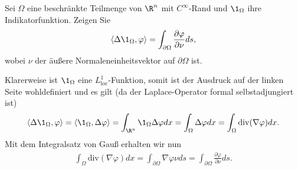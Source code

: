 
\begin{exercise}

Sei $\Omega$ eine beschränkte Teilmenge von $\R^n$ mit $C^{\infty}$-Rand und $\1_\Omega$ ihre
Indikatorfunktion. Zeigen Sie
\begin{align*}
  \langle \Delta \1_\Omega, \varphi \rangle
  = \int_{\partial\Omega} \frac{\partial \varphi}{\partial \nu} ds,
\end{align*}
wobei $\nu$ der äußere Normaleneinheitsvektor auf $\partial\Omega$ ist.

\end{exercise}


\begin{solution}

Klarerweise ist $\1_\Omega$ eine $L^1_{\mathrm{loc}}$-Funktion, somit ist der Ausdruck
auf der linken Seite wohldefiniert und es gilt (da der Laplace-Operator formal selbstadjungiert ist)
\begin{align*}
  \langle \Delta \1_\Omega, \varphi \rangle
  = \langle  \1_\Omega, \Delta \varphi \rangle
  = \int_{\R^n}\1_\Omega \Delta \varphi dx
  = \int_{\Omega} \Delta \varphi dx
  = \int_{\Omega} \mathrm{div} (\nabla \varphi) dx.
\end{align*}
Mit dem Integralsatz von Gauß erhalten wir nun
\begin{align*}
  \int_{\Omega} \mathrm{div} (\nabla \varphi) dx
  = \int_{\partial\Omega} \nabla \varphi \nu ds
  = \int_{\partial\Omega} \frac{\partial \varphi}{\partial \nu} ds.
\end{align*}
\end{solution}

